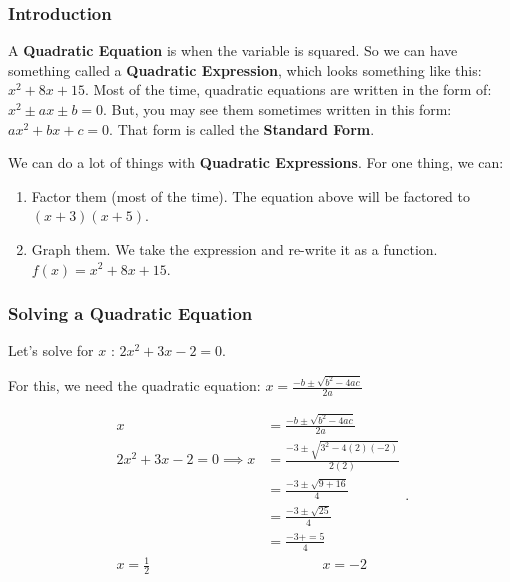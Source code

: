 
\begin{review}
  \label{rev:quadratic_equation}

  \subsubsection{Introduction}
  \label{sub_sub_sec:introduction}

  A \textbf{Quadratic Equation} is when the variable is squared. So we can have
  something called a \textbf{Quadratic Expression}, which looks something like
  this: $x^{2} + 8x + 15$. Most of the time, quadratic equations are written in
  the form of: $x^{2} \pm ax \pm b = 0$. But, you may see them sometimes written
  in this form: $ax^{2} + bx + c = 0$. That form is called the
  \textbf{Standard Form}.

  We can do a lot of things with \textbf{Quadratic Expressions}. For one thing,
  we can:

  \begin{enumerate}
    \label{enum:quadratic_equation}
  
    \item Factor them (most of the time). The equation above will be factored
      to $(x + 3)(x + 5)$.
    \item Graph them. We take the expression and re-write it as a function.
      $f(x) = x^{2} + 8x + 15$.

      \begin{figure}[H]
        \centering
        \label{fig:quadratic_equation}
      \end{figure}
  \end{enumerate}


  \subsubsection{Solving a Quadratic Equation}
  \label{sub_sub_sec:solving_a_quadratic_equation}

  Let's solve for $x$ : $2x^{2} + 3x - 2 = 0$.

  For this, we need the quadratic equation:
  $x = \frac{-b \pm \sqrt{b^{2} - 4ac}}{2a}$

  \begin{equation}
    \label{eqt:solving_a_quadratic_equation}
    \begin{split}
      x &= \frac{-b \pm \sqrt{b^{2} - 4ac}}{2a} \\
      2x^{2} + 3x - 2 = 0 \implies x &= \frac{-3 \pm \sqrt{3^{2} - 4(2)(-2)}}{2(2)} \\
      &= \frac{-3 \pm \sqrt{9 + 16}}{4} \\
      &= \frac{-3 \pm \sqrt{25}}{4} \\
      &= \frac{-3 += 5}{4} \\
      x = \frac{1}{2} \qquad \qquad &\qquad \qquad x = -2 \\
    \end{split}
  .\end{equation}


\end{review}
